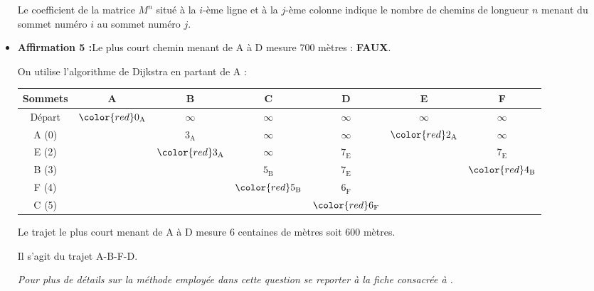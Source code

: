 \begin{corrige}
\begin{itemize}
{               Le coefficient de la matrice $M^n$ situé à la $i$-ème ligne et à la $j$-ème colonne indique le nombre de chemins de longueur $n$ menant du sommet numéro $i$ au sommet numéro $j$.
          }
          \item %
          \textbf{Affirmation 5 :}\quad Le plus court chemin menant de A à D mesure 700 mètres : \textbf{FAUX}.
          \par
          On utilise l'algorithme de Dijkstra en partant de A :
          \par
          \begin{center}
               \begin{extern}%
                    \begin{tabularx}{0.9\linewidth}{|c|C|C|C|C|C|C|}
                         \hline
                         Sommets			&   A 						& B 							& C							& D 							& E								& F   						\\ \hline
                         Départ			&  $\color{red}0_{\text{A}}$ 	& $\infty$					& $\infty$					& $\infty$					& $\infty$						& $\infty$	  				\\ \hline
                         A (0) 			&  		& $3_{\text{A}}$	 			& $\infty$ 					& $\infty$ 					& $\color{red}2_{\text{A}}$		& $\infty$ 					\\ \hline
                         E (2)			&  	 	& $\color{red}3_{\text{A}}$	& $\infty$ 					& $7_{\text{E}}$   			&  			& $7_{\text{E}}$				\\ \hline
                         B (3)			&  		& 	 	& $5_{\text{B}}$ 			& $7_{\text{E}}$ 			& 			& $\color{red}4_{\text{B}}$ 	\\ \hline
                         F (4)			&  		& 		& $\color{red}5_{\text{B}}$ 	& $6_{\text{F}}$  			& \cellcolor{black!20}			&   		\\ \hline
                         C (5)			&   		& \cellcolor{black!20} 		&  		& $\color{red}6_{\text{F}}$ 	& \cellcolor{black!20} 			&  		\\ \hline
                    \end{tabularx}
               \end{extern}
          \end{center}
          Le trajet le plus court menant de A à D mesure 6 centaines de mètres soit 600 mètres.
          \par
          Il s'agit du trajet A-B-F-D.
          \par
          \textit{Pour plus de détails sur la méthode employée dans cette question se reporter à la fiche  consacrée à .}
          \par
     \end{itemize}
\end{corrige}
